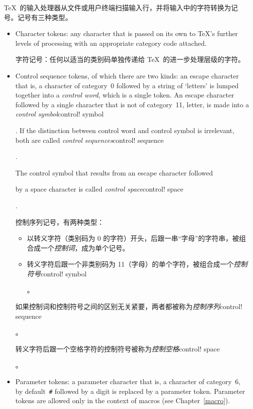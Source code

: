 \TeX\ 的输入处理器从文件或用户终端扫描输入行，并将输入中的字符转换为记号。记号有三种类型。
\begin{itemize}\item Character tokens: any character that is
	passed on its own to \TeX's
further levels of processing with an appropriate
category code attached.

字符记号：任何以适当的类别码单独传递给 \TeX\ 的进一步处理层级的字符。
\item Control sequence tokens, of which there are two kinds:
	an escape character 
\ldash that is,
a character of category~0 \rdash  followed
by a string of `letters' is
lumped together into a {\em control word}, which is a single token.
An escape character followed by a single character that is not of
category~11, letter, is made into a 
{\em control symbol}\term control! symbol\par.
If the distinction between control word and control symbol is
irrelevant, both are called 
{\em control sequences}\term control! sequence\par.

The control symbol that results from an escape character followed
\csterm {}\par
by a space character is called 
{\em control space}\term control! space\par.

控制序列记号，有两种类型： \begin{itemize}
      \item 以转义字符（类别码为 0 的字符）开头，后跟一串“字母”的字符串，被组合成一个{\em 控制词}，成为单个记号。
      \item 转义字符后跟一个非类别码为 11（字母）的单个字符，被组合成一个{\em 控制符号}\term control! symbol\par。
      \end{itemize}
      如果控制词和控制符号之间的区别无关紧要，两者都被称为{\em 控制序列}\term control! sequence\par。
      
      转义字符后跟一个空格字符的控制符号被称为{\em 控制空格}\term control! space\par。

\item Parameter tokens: a parameter character 
	\ldash that is, a character of category~6, by default~\verb=#= \rdash 
followed by a digit  is replaced by a parameter token.
Parameter tokens are allowed only in the context of
macros (see Chapter~\ref{macro}).


\end{itemize}
